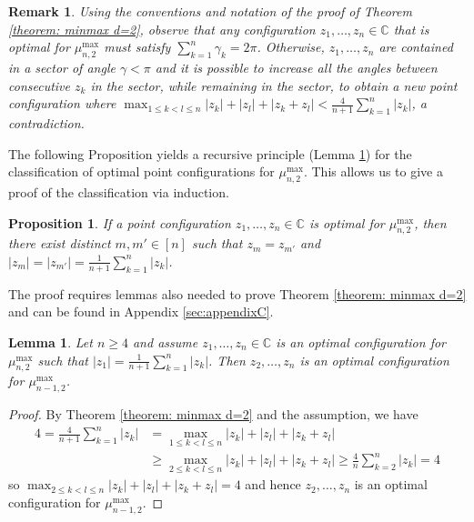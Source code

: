 \documentclass[reqno,hidelinks,11pt]{amsart}
\numberwithin{equation}{section}
\newtheorem{lemma}[theorem]{Lemma}
\newtheorem{remark}[theorem]{Remark}
\newtheorem{proposition}[theorem]{Proposition}
\def\CC{\mathbb{C}}
\begin{document}
\begin{remark}\label{remark: consecutive angles}
    Using the conventions and notation of the proof of Theorem \ref{theorem: minmax d=2}, observe that any configuration $z_1,\dots,z_n\in\CC$ that is optimal for $\mu_{n, 2}^{\max}$ must satisfy $\sum_{k=1}^n \gamma_k=2\pi$. Otherwise, $z_1,\dots,z_n$ are contained in a sector of angle $\gamma<\pi$ and it is possible to increase all the angles between consecutive $z_k$ in the sector, while remaining in the sector, to obtain a new point configuration where $\max_{1\le k<l\le n}|z_k|+|z_l|+|z_k+z_l|<\frac{4}{n+1}\sum_{k=1}^n|z_k|$, a contradiction.
\end{remark}
The following Proposition yields a recursive principle (Lemma \ref{lem: recursive principle}) for the classification of optimal point configurations for $\mu_{n,2}^{\max}$. This allows us to give a proof of the classification via induction.
\begin{proposition}\label{prop: two of length one}
    If a point configuration $z_1,\ldots,z_n\in\CC$ is optimal for $\mu_{n,2}^{\max}$, then there exist distinct $m,m'\in [n]$ such that $z_m=z_{m'}$ and $|z_m|=|z_{m'}|=\frac1{n+1}\sum_{k=1}^n |z_k|$.
\end{proposition}
The proof requires lemmas also needed to prove Theorem \ref{theorem: minmax d=2} and can be found in Appendix \ref{sec:appendixC}.

\begin{lemma}\label{lem: recursive principle}
Let $n \geq 4$ and assume $z_1, \ldots, z_n \in \CC$ is an optimal configuration for $\mu_{n, 2}^{\max}$ such that $|z_1| = \frac{1}{n + 1}\sum_{k=1}^n |z_k|$. Then $z_2, \ldots, z_n$ is an optimal configuration for $\mu_{n - 1, 2}^{\max}$.
\end{lemma}

\begin{proof}
By Theorem \ref{theorem: minmax d=2} and the assumption, we have
\begin{align*}
4=\frac{4}{n+1}\sum_{k=1}^n|z_k|&=\max_{1 \leq k < l \leq n}|z_k|+|z_l|+|z_k+z_l| \nonumber \\ 
&\geq \max_{2 \leq k < l \leq n}|z_k|+|z_l|+|z_k+z_l| \geq \frac{4}{n}\sum_{k=2}^n |z_k|=4 
\end{align*} 
so $\max_{2 \leq k < l \leq n}|z_k|+|z_l|+|z_k+z_l| = 4$ and hence $z_2, \ldots, z_n$ is an optimal configuration for $\mu_{n-1, 2}^{\max}$.
\end{proof}
\end{document}
